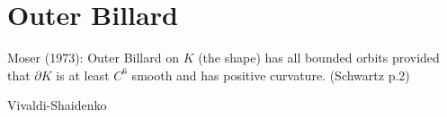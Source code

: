 \documentclass[12pt,twoside,draft]{book}
\begin{document}
\chapter{Outer Billard}

Moser (1973):
Outer Billard on $K$ (the shape) has all bounded orbits provided that $\partial K$ is at least $C^6$ smooth and has positive curvature. (Schwartz p.2)

Vivaldi-Shaidenko
 



\printindex
\end{document}
